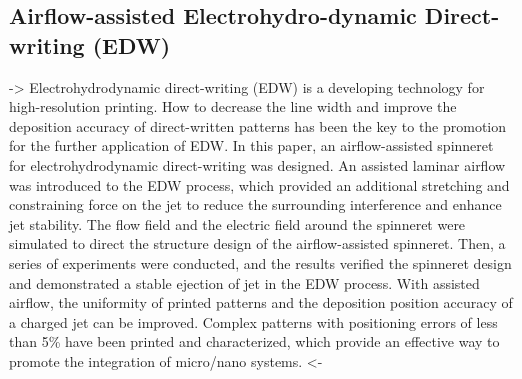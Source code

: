 \documentclass[5p,,preprint,12pt,twocolumn]{elsarticle}
\begin{document}
\subsection{Airflow-assisted Electrohydro-dynamic Direct-writing (EDW) \unskip~\protect\cite{527120:11974312}}-{\textgreater} Electrohydrodynamic direct-writing (EDW) is a developing technology for high-resolution printing. How to decrease the line width and improve the deposition accuracy of direct-written patterns has been the key to the promotion for the further application of EDW. In this paper, an airflow-assisted spinneret for electrohydrodynamic direct-writing was designed. An assisted laminar airflow was introduced to the EDW process, which provided an additional stretching and constraining force on the jet to reduce the surrounding interference and enhance jet stability. The flow field and the electric field around the spinneret were simulated to direct the structure design of the airflow-assisted spinneret. Then, a series of experiments were conducted, and the results verified the spinneret design and demonstrated a stable ejection of jet in the EDW process. With assisted airflow, the uniformity of printed patterns and the deposition position accuracy of a charged jet can be improved. Complex patterns with positioning errors of less than 5\% have been printed and characterized, which provide an effective way to promote the integration of micro/nano systems. {\textless}-
\end{document}
